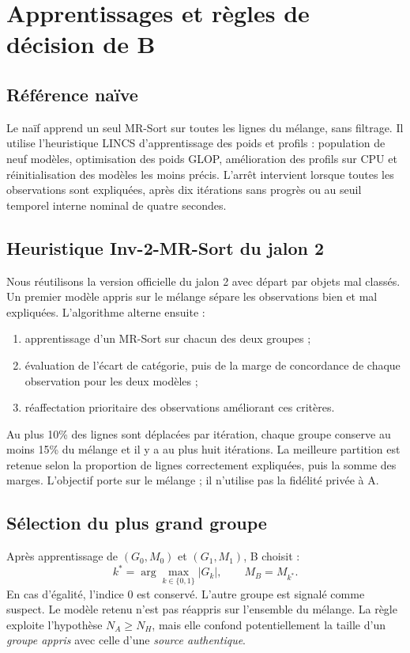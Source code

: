 \documentclass[11pt,a4paper]{article}
\begin{document}
\section{Apprentissages et règles de décision de B}
\subsection{Référence naïve}

Le naïf apprend un seul MR-Sort sur toutes les lignes du mélange, sans filtrage.
Il utilise l'heuristique LINCS d'apprentissage des poids et profils : population
de neuf modèles, optimisation des poids GLOP, amélioration des profils sur CPU
et réinitialisation des modèles les moins précis. L'arrêt intervient lorsque
toutes les observations sont expliquées, après dix itérations sans progrès ou
au seuil temporel interne nominal de quatre secondes.

\subsection{Heuristique Inv-2-MR-Sort du jalon 2}

Nous réutilisons la version officielle du jalon 2 avec départ par objets mal
classés. Un premier modèle appris sur le mélange sépare les observations bien
et mal expliquées. L'algorithme alterne ensuite :
\begin{enumerate}
\item apprentissage d'un MR-Sort sur chacun des deux groupes ;
\item évaluation de l'écart de catégorie, puis de la marge de concordance de
chaque observation pour les deux modèles ;
\item réaffectation prioritaire des observations améliorant ces critères.
\end{enumerate}
Au plus 10\% des lignes sont déplacées par itération, chaque groupe conserve
au moins 15\% du mélange et il y a au plus huit itérations. La meilleure
partition est retenue selon la proportion de lignes correctement expliquées,
puis la somme des marges. L'objectif porte sur le mélange ; il n'utilise pas
la fidélité privée à A.

\subsection{Sélection du plus grand groupe}

Après apprentissage de $(G_0,M_0)$ et $(G_1,M_1)$, B choisit :
\begin{equation}
 k^*=\arg\max_{k\in\{0,1\}}|G_k|,\qquad M_B=M_{k^*}.
 \label{eq:grand}
\end{equation}
En cas d'égalité, l'indice 0 est conservé. L'autre groupe est signalé comme
suspect. Le modèle retenu n'est pas réappris sur l'ensemble du mélange.
La règle exploite l'hypothèse $N_A\geq N_H$, mais elle confond potentiellement
la taille d'un \emph{groupe appris} avec celle d'une \emph{source authentique}.
\end{document}
